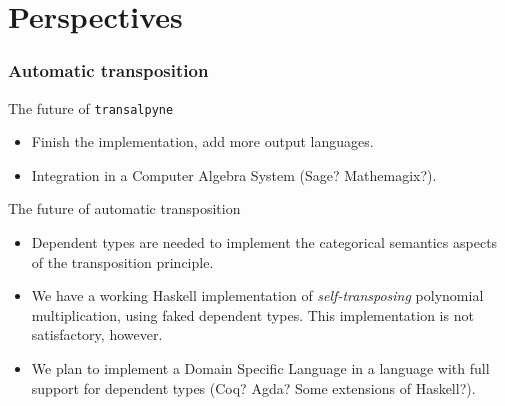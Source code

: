 \documentclass[10pt,usepdftitle=false]{beamer}
\begin{document}


\section{Perspectives}

\begin{frame}
  \frametitle{Automatic transposition}
  
  \begin{block}{The future of \texttt{transalpyne}}
    \begin{itemize}
    \item Finish the implementation, add more output languages.
    \item Integration in a Computer Algebra System (Sage?
      Mathemagix?).
    \end{itemize}
  \end{block}
  
  \begin{block}{The future of automatic transposition}
    \begin{itemize}
    \item Dependent types are needed to implement the categorical
      semantics aspects of the transposition principle.
    \item We have a working Haskell implementation of
      \textit{self-transposing} polynomial multiplication, using faked
      dependent types. This implementation is not satisfactory, however.
    \item We plan to implement a Domain Specific Language in a
      language with full support for dependent types (Coq? Agda? Some
      extensions of Haskell?).
    \end{itemize}
  \end{block}  
\end{frame}

\end{document}
